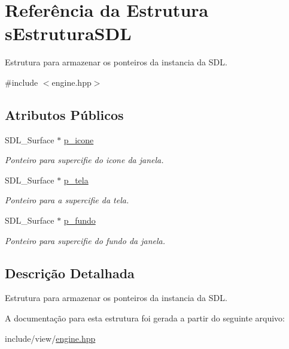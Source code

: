 \hypertarget{structsEstruturaSDL}{
\section{Referência da Estrutura sEstruturaSDL}
\label{structsEstruturaSDL}
}


Estrutura para armazenar os ponteiros da instancia da SDL.  




{\ttfamily \#include $<$engine.hpp$>$}

\subsection*{Atributos Públicos}
\begin{DoxyCompactItemize}
\item 
\hypertarget{structsEstruturaSDL_af236dc74a6dfca6d43388bfd118b7bc5}{
SDL\_\-Surface $\ast$ \hyperlink{structsEstruturaSDL_af236dc74a6dfca6d43388bfd118b7bc5}{p\_\-icone}}
\label{structsEstruturaSDL_af236dc74a6dfca6d43388bfd118b7bc5}

\begin{DoxyCompactList}\small\item\em Ponteiro para supercifie do icone da janela. \item\end{DoxyCompactList}\item 
\hypertarget{structsEstruturaSDL_a86274a4125a1d4fbcbeb00e7c9f5e2f7}{
SDL\_\-Surface $\ast$ \hyperlink{structsEstruturaSDL_a86274a4125a1d4fbcbeb00e7c9f5e2f7}{p\_\-tela}}
\label{structsEstruturaSDL_a86274a4125a1d4fbcbeb00e7c9f5e2f7}

\begin{DoxyCompactList}\small\item\em Ponteiro para a supercifie da tela. \item\end{DoxyCompactList}\item 
\hypertarget{structsEstruturaSDL_ab3f187456d2edfe1082960f238110b84}{
SDL\_\-Surface $\ast$ \hyperlink{structsEstruturaSDL_ab3f187456d2edfe1082960f238110b84}{p\_\-fundo}}
\label{structsEstruturaSDL_ab3f187456d2edfe1082960f238110b84}

\begin{DoxyCompactList}\small\item\em Ponteiro para supercifie do fundo da janela. \item\end{DoxyCompactList}\end{DoxyCompactItemize}


\subsection{Descrição Detalhada}
Estrutura para armazenar os ponteiros da instancia da SDL. 

A documentação para esta estrutura foi gerada a partir do seguinte arquivo:\begin{DoxyCompactItemize}
\item 
include/view/\hyperlink{engine_8hpp}{engine.hpp}\end{DoxyCompactItemize}
